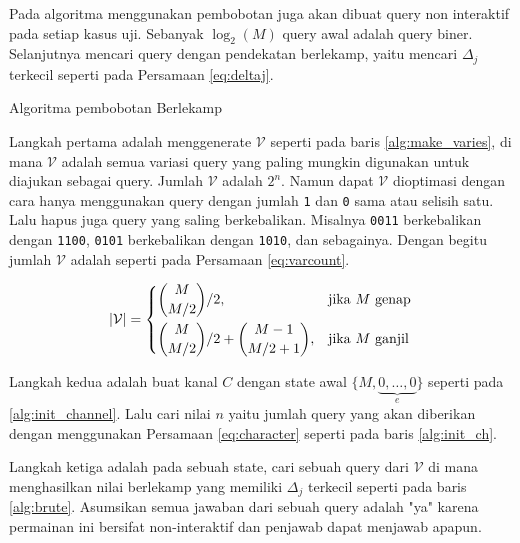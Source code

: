 Pada algoritma menggunakan pembobotan juga akan dibuat query non interaktif pada setiap kasus uji. Sebanyak $\log_2(M)$ query awal adalah query biner. Selanjutnya mencari query dengan pendekatan berlekamp, yaitu mencari $\Delta_j$ terkecil seperti pada Persamaan \ref{eq:deltaj}.

\begin{algorithm}[h]
\caption{Algoritma pembobotan Berlekamp}
\label{alg:bobot_berlekamp}
\end{algorithm}

Langkah pertama adalah menggenerate $\mathcal{V}$ seperti pada baris \ref{alg:make_varies}, di mana $\mathcal{V}$ adalah semua variasi query yang paling mungkin digunakan untuk diajukan sebagai query. Jumlah $\mathcal{V}$ adalah $2^n$. Namun dapat $\mathcal{V}$ dioptimasi dengan cara hanya menggunakan query dengan jumlah \texttt{1} dan \texttt{0} sama atau selisih satu. Lalu hapus juga query yang saling berkebalikan. Misalnya \texttt{0011} berkebalikan dengan \texttt{1100}, \texttt{0101} berkebalikan dengan \texttt{1010}, dan sebagainya. Dengan begitu jumlah $\mathcal{V}$ adalah seperti pada Persamaan \ref{eq:varcount}.

\begin{equation}
\label{eq:varcount}
|\mathcal{V}| = \begin{dcases}
  \binom{M}{M/2} / 2, & \text{jika } M \text{ genap} \\
  \binom{M}{M/2} / 2 + \binom{M-1}{M/2 + 1}, & \text{jika } M \text{ ganjil}
\end{dcases}
\end{equation}

Langkah kedua adalah buat kanal $C$ dengan state awal $\{M,\underbrace{0,\ldots,0}_e\}$ seperti pada \ref{alg:init_channel}. Lalu cari nilai $n$ yaitu jumlah query yang akan diberikan dengan menggunakan Persamaan \ref{eq:character} seperti pada baris \ref{alg:init_ch}.

Langkah ketiga adalah pada sebuah state, cari sebuah query dari $\mathcal{V}$ di mana menghasilkan nilai berlekamp yang memiliki $\Delta_j$ terkecil seperti pada baris \ref{alg:brute}. Asumsikan semua jawaban dari sebuah query adalah "ya" karena permainan ini bersifat non-interaktif dan penjawab dapat menjawab apapun.

